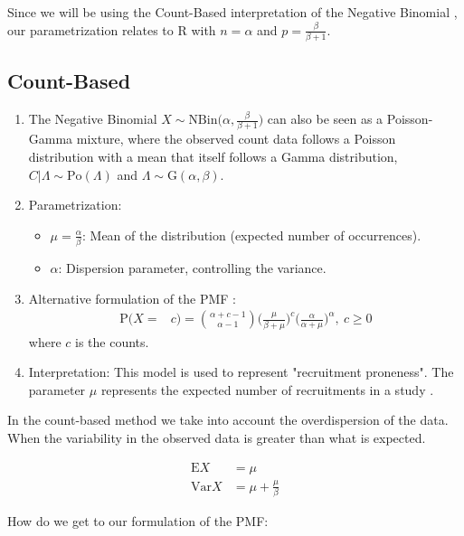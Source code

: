 Since we will be using the Count-Based interpretation of the Negative Binomial \citep{hilbe2011negative}, our parametrization relates to R with $n = \alpha$ and $p = \frac{\beta}{\beta+1}$.

\subsection{Count-Based}
\begin{enumerate}
\item The Negative Binomial $X\sim\textrm{NBin}\Bigg(\alpha,\frac{\beta}{\beta+1}\Bigg)$ can also be seen as a Poisson-Gamma mixture, where the observed count data follows a Poisson distribution with a mean that itself follows a Gamma distribution, $C|\Lambda \sim \textrm{Po}(\Lambda)$ and $\Lambda \sim \textrm{G}(\alpha,\beta)$. 
\item Parametrization:
	\begin{itemize}
	\item $\mu = \frac{\alpha}{\beta}$: Mean of the distribution (expected number of occurrences).
	\item $\alpha$: Dispersion parameter, controlling the variance.
	\end{itemize}
\item Alternative formulation of the PMF \citep{hilbe2011negative}:
\begin{align*}
\textrm{P}(X=&c) = \binom{\alpha+c-1}{\alpha-1}\Bigg (\frac{\mu}{\beta+\mu}\Bigg)^{c} \Bigg(\frac{\alpha}{\alpha+\mu}\Bigg)^{\alpha}, \ c\geq 0 
\end{align*}
where $c$ is the counts.
\item Interpretation: This model is used to represent "recruitment proneness". The parameter $\mu$ represents the expected number of recruitments in a study \citep{johnson2005univariate}.

\end{enumerate}

In the count-based method we take into account the overdispersion of the data. When the variability in the observed data is greater than what is expected.

\begin{align*}
\textrm{E}X&=\mu\\
\textrm{Var}X&=\mu + \frac{\mu}{\beta}
\end{align*}

How do we get to our formulation of the PMF:

